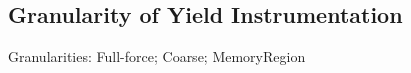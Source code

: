 \subsection{Granularity of Yield Instrumentation}
\label{eval:granularity}

Granularities: Full-force; Coarse; MemoryRegion